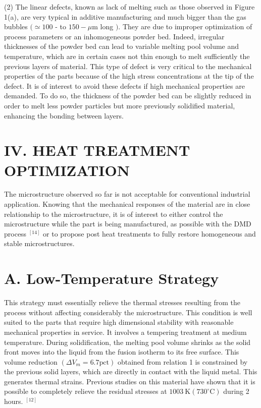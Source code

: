 \documentclass[10pt]{article}
\begin{document}
(2) The linear defects, known as lack of melting such as those observed in Figure 1(a), are very typical in additive manufacturing and much bigger than the gas bubbles $(\simeq 100$ - to $150-\mu \mathrm{m}$ long $)$. They are due to improper optimization of process parameters or an inhomogeneous powder bed. Indeed, irregular thicknesses of the powder bed can lead to variable melting pool volume and temperature, which are in certain cases not thin enough to melt sufficiently the previous layers of material. This type of defect is very critical to the mechanical properties of the parts because of the high stress concentrations at the tip of the defect. It is of interest to avoid these defects if high mechanical properties are demanded. To do so, the thickness of the powder bed can be slightly reduced in order to melt less powder particles but more previously solidified material, enhancing the bonding between layers.

\section*{IV. HEAT TREATMENT OPTIMIZATION}
The microstructure observed so far is not acceptable for conventional industrial application. Knowing that the mechanical responses of the material are in close relationship to the microstructure, it is of interest to either control the microstructure while the part is being manufactured, as possible with the DMD process ${ }^{[14]}$ or to propose post heat treatments to fully restore homogeneous and stable microstructures.

\section*{A. Low-Temperature Strategy}
This strategy must essentially relieve the thermal stresses resulting from the process without affecting considerably the microstructure. This condition is well suited to the parts that require high dimensional stability with reasonable mechanical properties in service. It involves a tempering treatment at medium temperature. During solidification, the melting pool volume shrinks as the solid front moves into the liquid from the fusion isotherm to its free surface. This volume reduction $\left(\Delta V_{m}=6.7 \mathrm{pct}\right)$ obtained from relation 1 is constrained by the previous solid layers, which are directly in contact with the liquid metal. This generates thermal strains. Previous studies on this material have shown that it is possible to completely relieve the residual stresses at $1003 \mathrm{~K}\left(730^{\circ} \mathrm{C}\right)$ during 2 hours. ${ }^{[12]}$
\end{document}
